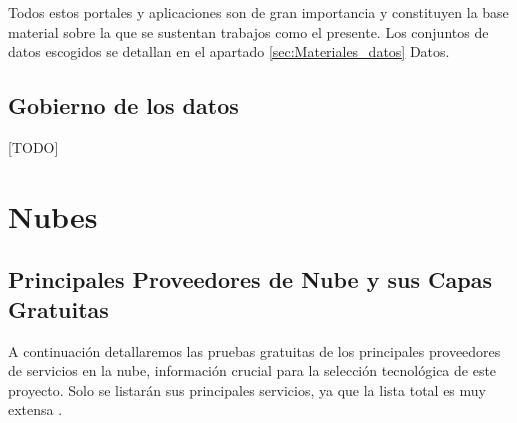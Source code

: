 	Todos estos portales y aplicaciones son de gran importancia y constituyen la base material sobre la que se sustentan trabajos como el presente. Los conjuntos de datos escogidos se detallan en el apartado \ref{sec:Materiales_datos} Datos.
	
	\subsection{Gobierno de los datos}
	
	[TODO]
	
\section{Nubes}


\subsection{Principales Proveedores de Nube y sus Capas Gratuitas}
\label{sec:cloud-free-tiers}

A continuación detallaremos las pruebas gratuitas de los principales proveedores de servicios en la nube, información crucial para la selección tecnológica de este proyecto. Solo se listarán sus principales servicios, ya que la lista total es muy extensa \citep{free-for-dev}.

